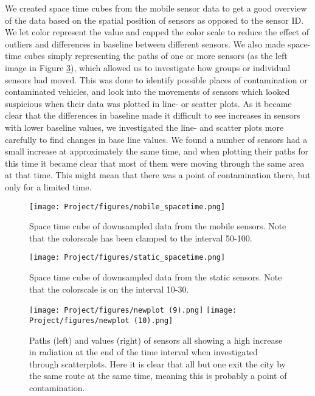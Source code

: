 \documentclass[journal]{vgtc}                %
\begin{document}
We created space time cubes from the mobile sensor data to get a good overview of the data based on the spatial position of sensors as opposed to the sensor ID. We let color represent the value and capped the color scale to reduce the effect of outliers and differences in baseline between different sensors. We also made space-time cubes simply representing the paths of one or more sensors (as the left image in Figure \ref{fig:contamination}), which allowed us to investigate how groups or individual sensors had moved. This was done to identify possible places of contamination or contaminated vehicles, and look into the movements of sensors which looked suspicious when their data was plotted in line- or scatter plots. As it became clear that the differences in baseline made it difficult to see increases in sensors with lower baseline values, we investigated the line- and scatter plots more carefully to find changes in base line values. We found a number of sensors had a small increase at approximately the same time, and when plotting their paths for this time it became clear that most of them were moving through the same area at that time. This might mean that there was a point of contamination there, but only for a limited time. 
\begin{figure}[h!]
    \centering
    \texttt{[image: Project/figures/mobile\_spacetime.png]}
    \caption{Space time cube of downsampled data from the mobile sensors. Note that the colorscale has been clamped to the interval 50-100.}
      \label{fig:spacetime_mobile}
\end{figure}
\begin{figure}[h!]
    \centering
    \texttt{[image: Project/figures/static\_spacetime.png]}
    \caption{Space time cube of downsampled data from the static sensors. Note that the colorscale is on the interval 10-30.}
      \label{fig:spacetime_static}
\end{figure}
\begin{figure}[h!]
    \centering
    \texttt{[image: Project/figures/newplot (9).png]}
    \texttt{[image: Project/figures/newplot (10).png]}
    \caption{Paths (left) and values (right) of sensors all showing a high increase in radiation at the end of the time interval when investigated through scatterplots. Here it is clear that all but one exit the city by the same route at the same time, meaning this is probably a point of contamination.}
      \label{fig:contamination}
\end{figure}\\
\end{document}
